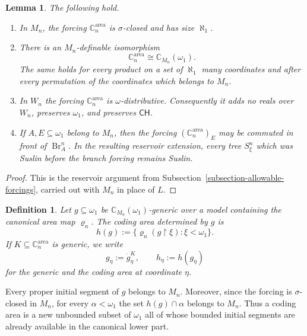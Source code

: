 \documentclass[a4paper,11pt]{article}
\newtheorem{lemma}[theorem]{Lemma}
\newtheorem{definition}[theorem]{Definition}
\newcommand{\forceC}{\mathbb{C}}
\newcommand{\CH}{\mathsf{CH}}
\begin{document}
\begin{lemma}
\label{lemma-basic-properties-Mn-Cohen-reservoir}
The following hold.
\begin{enumerate}
   \item In $M_n$, the forcing $\forceC^{\mathrm{area}}_n$ is
         $\sigma$-closed and has size $\aleph_1$.

   \item There is an
         $M_n$-definable isomorphism
         \[
            \forceC^{\mathrm{area}}_n
            \cong \mathbb C_{M_n}(\omega_1).
         \]
         The same holds for every product on a set of $\aleph_1$ many
         coordinates and after every permutation of the coordinates which
         belongs to $M_n$.

   \item In $W_n$ the forcing $\forceC^{\mathrm{area}}_n$ is
         $\omega$-distributive.  Consequently it adds no reals over $W_n$,
         preserves $\omega_1$, and preserves $\CH$.

   \item If $A,E\subseteq\omega_1$ belong to $M_n$, then the forcing
         $(\forceC^{\mathrm{area}}_n)_E$ may be commuted in front of
         $\operatorname{Br}^n_A$.  In the resulting reservoir extension,
         every tree $S^n_\xi$ which was Suslin before the branch forcing
         remains Suslin.
\end{enumerate}
\end{lemma}


\begin{proof}
This is the reservoir argument from
Subsection~\ref{subsection-allowable-forcings}, carried out with $M_n$ in
place of $L$. 
\end{proof}

\begin{definition}
\label{definition-Mn-Cohen-coding-area}
Let $g\subseteq\omega_1$ be
$\mathbb C_{M_n}(\omega_1)$-generic over a model containing the canonical
area map $\varrho_n$.  The \emph{coding area determined by $g$} is
\[
   h(g)
   :=\{\varrho_n(g\restriction\xi):\xi<\omega_1\}.
\]
If $K\subseteq\forceC^{\mathrm{area}}_n$ is generic, we write
\[
   g_\eta:=\dot g_\eta^K,
   \qquad
   h_\eta:=h(g_\eta)
\]
for the generic and the coding area at coordinate $\eta$.
\end{definition}

Every proper initial segment of $g$ belongs to $M_n$.  Moreover, since the
forcing is $\sigma$-closed in $M_n$, for every $\alpha<\omega_1$ the set
$h(g)\cap\alpha$ belongs to $M_n$.  Thus a coding area is a new unbounded
subset of $\omega_1$ all of whose bounded initial segments are already
available in the canonical lower part.
\end{document}
